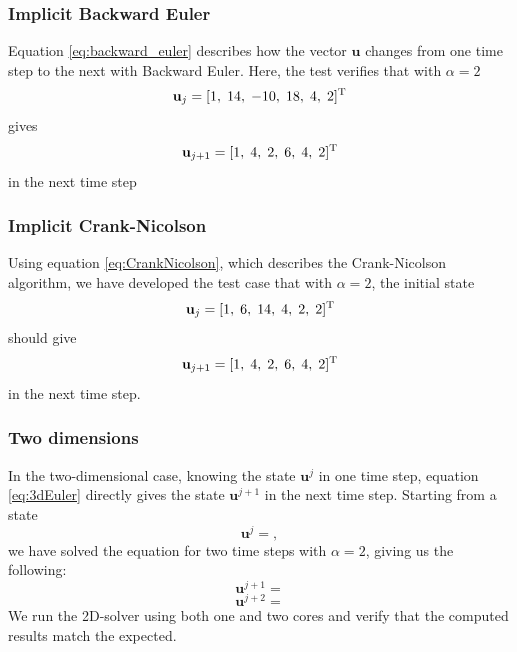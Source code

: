 \documentclass[reprint, english,notitlepage,nofootinbib]{revtex4-1}  %
\newcommand{\vc}[1]{\mathbf{#1}}
\begin{document}
\subsubsection*{Implicit Backward Euler}

Equation \eqref{eq:backward_euler} describes how the vector $\vc u$ changes from one time step to the next with Backward Euler. Here, the test verifies that with \(\alpha = 2\)
\begin{equation*}
  \vc u_j = [1, \; 14, \; -10, \; 18, \; 4, \; 2]^{\text T}
\end{equation*}
gives
\begin{equation*}
  \vc u_{j+1} = [1, \; 4, \; 2, \; 6, \; 4, \; 2]^{\text T}
\end{equation*}
in the next time step

\subsubsection*{Implicit Crank-Nicolson}

Using equation \eqref{eq:CrankNicolson}, which describes the Crank-Nicolson algorithm, we have developed the test case that  with \(\alpha = 2\), the initial state
\begin{equation*}
  \vc u_j = [1, \; 6, \; 14, \; 4, \; 2, \; 2]^{\text T}
\end{equation*}
should give
\begin{equation*}
  \vc u_{j+1} = [1, \; 4, \; 2, \; 6, \; 4, \; 2]^{\text T}
\end{equation*}
in the next time step.

\subsubsection*{Two dimensions}

In the two-dimensional case, knowing the state $\vc u^j$ in one time step, equation \eqref{eq:3dEuler} directly gives the state $\vc u^{j+1}$ in the next time step. Starting from a state
\begin{equation*}
  \vc u^j =
  ,
\end{equation*}
we have solved the equation for two time steps with \(\alpha = 2\), giving us the following:
\begin{equation*}
  \vc u^{j+1} =
  
\end{equation*}
\begin{equation*}
  \vc u^{j+2} =
  
\end{equation*}
We run the 2D-solver using both one and two cores and verify that the computed results match the expected.
\end{document}
